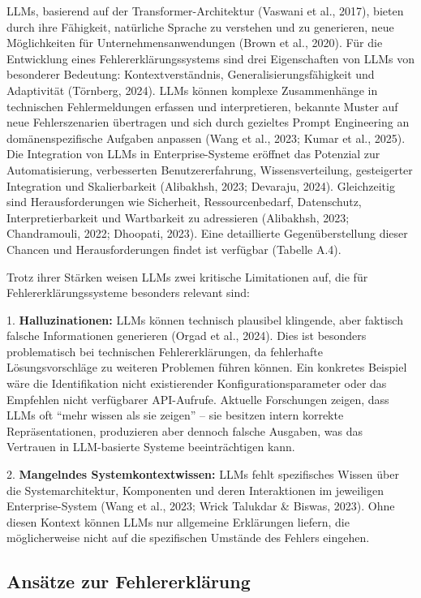 \documentclass[
  a4paper,
  12pt,
  oneside,
  open=any,
  BCOR=12mm,
  DIV=14,
  parskip=half*,
  headsepline,
  footsepline,
  pointlessnumbers,
  liststotoc,
  numbers=noenddot,
  listof=totoc]{scrartcl}
\begin{document}
LLMs, basierend auf der Transformer-Architektur (Vaswani et al., 2017),
bieten durch ihre Fähigkeit, natürliche Sprache zu verstehen und zu
generieren, neue Möglichkeiten für Unternehmensanwendungen (Brown et
al., 2020). Für die Entwicklung eines Fehlererklärungssystems sind drei
Eigenschaften von LLMs von besonderer Bedeutung: Kontextverständnis,
Generalisierungsfähigkeit und Adaptivität (Törnberg, 2024). LLMs können
komplexe Zusammenhänge in technischen Fehlermeldungen erfassen und
interpretieren, bekannte Muster auf neue Fehlerszenarien übertragen und
sich durch gezieltes Prompt Engineering an domänenspezifische Aufgaben
anpassen (Wang et al., 2023; Kumar et al., 2025). Die Integration von
LLMs in Enterprise-Systeme eröffnet das Potenzial zur Automatisierung,
verbesserten Benutzererfahrung, Wissensverteilung, gesteigerter
Integration und Skalierbarkeit (Alibakhsh, 2023; Devaraju, 2024).
Gleichzeitig sind Herausforderungen wie Sicherheit, Ressourcenbedarf,
Datenschutz, Interpretierbarkeit und Wartbarkeit zu adressieren
(Alibakhsh, 2023; Chandramouli, 2022; Dhoopati, 2023). Eine detaillierte
Gegenüberstellung dieser Chancen und Herausforderungen findet ist
verfügbar (Tabelle A.4).

Trotz ihrer Stärken weisen LLMs zwei kritische Limitationen auf, die für
Fehlererklärungssysteme besonders relevant sind:

1. \textbf{Halluzinationen:} LLMs können technisch plausibel klingende,
aber faktisch falsche Informationen generieren (Orgad et al., 2024).
Dies ist besonders problematisch bei technischen Fehlererklärungen, da
fehlerhafte Lösungsvorschläge zu weiteren Problemen führen können. Ein
konkretes Beispiel wäre die Identifikation nicht existierender
Konfigurationsparameter oder das Empfehlen nicht verfügbarer
API-Aufrufe. Aktuelle Forschungen zeigen, dass LLMs oft ``mehr wissen
als sie zeigen'' -- sie besitzen intern korrekte Repräsentationen,
produzieren aber dennoch falsche Ausgaben, was das Vertrauen in
LLM-basierte Systeme beeinträchtigen kann.

2. \textbf{Mangelndes Systemkontextwissen:} LLMs fehlt spezifisches
Wissen über die Systemarchitektur, Komponenten und deren Interaktionen
im jeweiligen Enterprise-System (Wang et al., 2023; Wrick Talukdar \&
Biswas, 2023). Ohne diesen Kontext können LLMs nur allgemeine
Erklärungen liefern, die möglicherweise nicht auf die spezifischen
Umstände des Fehlers eingehen.

\subsection{Ansätze zur
Fehlererklärung}\label{ansuxe4tze-zur-fehlererkluxe4rung}
\end{document}
